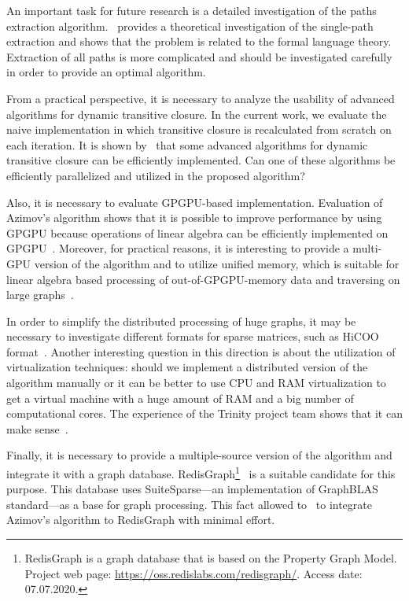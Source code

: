 An important task for future research is a detailed investigation of the paths extraction algorithm.~\cite{HellSinglePath} provides a theoretical investigation of the single-path extraction and shows that the problem is related to the formal language theory.
Extraction of all paths is more complicated and should be investigated carefully in order to provide an optimal algorithm.


From a practical perspective, it is necessary to analyze the usability of advanced algorithms for dynamic transitive closure.
In the current work, we evaluate the naive implementation in which transitive closure is recalculated from scratch on each iteration.
It is shown by~\cite{cs6345} that some advanced algorithms for dynamic transitive closure can be efficiently implemented.
Can one of these algorithms be efficiently parallelized and utilized in the proposed algorithm?


Also, it is necessary to evaluate GPGPU-based implementation.
Evaluation of Azimov's algorithm shows that it is possible to improve performance by using GPGPU because operations of linear algebra can be efficiently implemented on GPGPU~\citep{Mishin:2019:ECP:3327964.3328503,10.1145/3398682.3399163}.
Moreover, for practical reasons, it is interesting to provide a multi-GPU version of the algorithm and to utilize unified memory, which is suitable for linear algebra based processing of out-of-GPGPU-memory data and traversing on large graphs~\citep{8946118,10.14778/3384345.3384358}.

In order to simplify the distributed processing of huge graphs, it may be necessary to investigate different formats for sparse matrices, such as HiCOO format~\citep{10.5555/3291656.3291682}.
Another interesting question in this direction is about the utilization of virtualization techniques: should we implement a distributed version of the algorithm manually or it can be better to use CPU and RAM virtualization to get a virtual machine with a huge amount of RAM and a big number of computational cores.
The experience of the Trinity project team shows that it can make sense~\citep{10.1145/2463676.2467799}.

Finally, it is necessary to provide a multiple-source version of the algorithm and integrate it with a graph database.
RedisGraph\footnote{RedisGraph is a graph database that is based on the Property Graph
Model. Project web page: \url{https://oss.redislabs.com/redisgraph/}. Access date:
07.07.2020.}~\citep{8778293} is a suitable candidate for this purpose.
This database uses SuiteSparse---an implementation of GraphBLAS standard---as a base for graph processing.
This fact allowed to~\cite{10.1145/3398682.3399163} to integrate Azimov's algorithm to RedisGraph with minimal effort.
